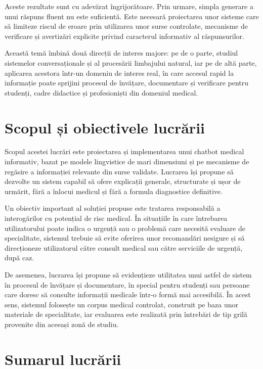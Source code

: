 \documentclass[12pt, a4paper, oneside, romanian]{teza-upb}
\begin{document}
Aceste rezultate sunt cu adevărat îngrijorătoare. Prin urmare, simpla generare a unui răspuns fluent nu este suficientă. Este necesară proiectarea unor sisteme care să limiteze riscul de eroare prin utilizarea unor surse controlate, mecanisme de verificare și avertizări explicite privind caracterul informativ al răspunsurilor.

Această temă îmbină două direcții de interes majore: pe de o parte, studiul sistemelor conversaționale și al procesării limbajului natural, iar pe de altă parte, aplicarea acestora într-un domeniu de interes real, în care accesul rapid la informație poate sprijini procesul de învățare, documentare și verificare pentru studenți, cadre didactice și profesioniști din domeniul medical.


\section{Scopul și obiectivele lucrării}
Scopul acestei lucrări este proiectarea și implementarea unui chatbot medical informativ, bazat pe modele lingvistice de mari dimensiuni și pe mecanisme de regăsire a informației relevante din surse validate. Lucrarea își propune să dezvolte un sistem capabil să ofere explicații generale, structurate și ușor de urmărit, fără a înlocui medicul și fără a formula diagnostice definitive.

Un obiectiv important al soluției propuse este tratarea responsabilă a interogărilor cu potențial de risc medical. În situațiile în care întrebarea utilizatorului poate indica o urgență sau o problemă care necesită evaluare de specialitate, sistemul trebuie să evite oferirea unor recomandări nesigure și să direcționeze utilizatorul către consult medical sau către serviciile de urgență, după caz.

De asemenea, lucrarea își propune să evidențieze utilitatea unui astfel de sistem în procesul de învățare și documentare, în special pentru studenți sau persoane care doresc să consulte informații medicale într-o formă mai accesibilă. În acest sens, sistemul folosește un corpus medical controlat, construit pe baza unor materiale de specialitate, iar evaluarea este realizată prin întrebări de tip grilă provenite din aceeași zonă de studiu.



\section{Sumarul lucrării}
\end{document}

